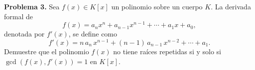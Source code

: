 \textbf{Problema 3.} Sea $f(x)\in K[x]$ un polinomio sobre un cuerpo $K$. La derivada formal de
\[
f(x) = a_n x^n + a_{n-1} x^{n-1} + \cdots + a_1 x + a_0,
\]
denotada por $f'(x)$, se define como
\[
f'(x) = n\,a_n\,x^{n-1} + (n-1)\,a_{n-1}\,x^{n-2} + \cdots + a_1.
\]
Demuestre que el polinomio $f(x)$ no tiene raíces repetidas si y solo si $\gcd(f(x),f'(x)) = 1$ en $K[x]$.
